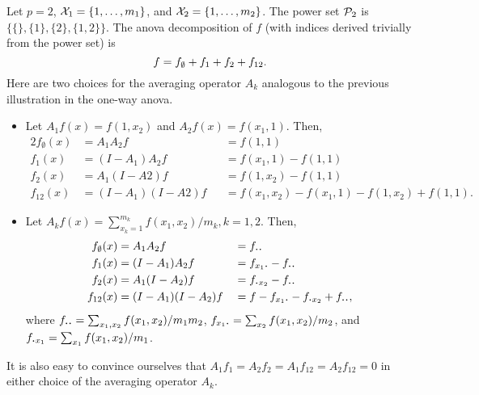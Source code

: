 \begin{example}
  Let $p=2$, ${\mathcal X}_1=\{1,\dots,m_1\}$, and ${\mathcal X}_2=\{1,\dots,m_2\}$.
  The power set ${\mathcal P}_2$ is $\big\{ \{\}, \{1\}, \{2\}, \{1,2\} \big\}$.
  The \gls*{anova} decomposition of $f$ (with indices derived trivially from the power set) is
  \vspace{-0.3em}
  \[
    f = f_\emptyset + f_1 + f_2 + f_{12}.\vspace{-0.5em}
  \]
  Here are two choices for the averaging operator $A_k$ analogous to the previous illustration in the one-way \gls*{anova}.
    \begin{itemize}[noitemsep]
    \item Let $A_1f(x) = f(1,x_2)$ and $A_2f(x) = f(x_1,1)$. Then,
    \begin{alignat*}{2}
      f_\emptyset(x) &= A_1A_2 f          &&= f(1,1) \\
      f_1(x) &= (I-A_1)A_2f       &&= f(x_1,1) - f(1,1) \\
      f_2(x) &= A_1(I-A2)f        &&= f(1,x_2) - f(1,1) \\
      f_{12}(x) &= (I-A_1)(I-A2)f &&= f(x_1,x_2) - f(x_1,1) - f(1,x_2) + f(1,1). 
    \end{alignat*}
    
    \item Let $A_kf(x) = \sum_{x_k=1}^{m_k} f(x_1,x_2) / m_k, k=1,2$. Then,
    \begin{alignat*}{2}
      f_\emptyset(x) &= A_1A_2 f          &&= f_{\bigcdot\bigcdot} \\
      f_1(x) &= (I-A_1)A_2f       &&= f_{x_1\bigcdot} - f_{\bigcdot\bigcdot} \\
      f_2(x) &= A_1(I-A_2)f        &&= f_{\bigcdot x_2} - f_{\bigcdot\bigcdot} \\
      f_{12}(x) &= (I-A_1)(I-A_2)f &&= f - f_{x_1\bigcdot} - f_{\bigcdot x_2} + f_{\bigcdot\bigcdot},
    \end{alignat*}
    where $f_{\bigcdot\bigcdot} = \sum_{x_1,x_2} f(x_1,x_2) / m_1m_2$, $ f_{x_1\bigcdot} = \sum_{x_2} f(x_1,x_2)/m_2$, and \newline $f_{\bigcdot x_1} = \sum_{x_1} f(x_1,x_2)/m_1$.
  \end{itemize}
  
  It is also easy to convince ourselves that $A_1f_1 = A_2f_2 = A_1f_{12} = A_2f_{12} = 0$ in either choice of the averaging operator $A_k$.
\end{example}


